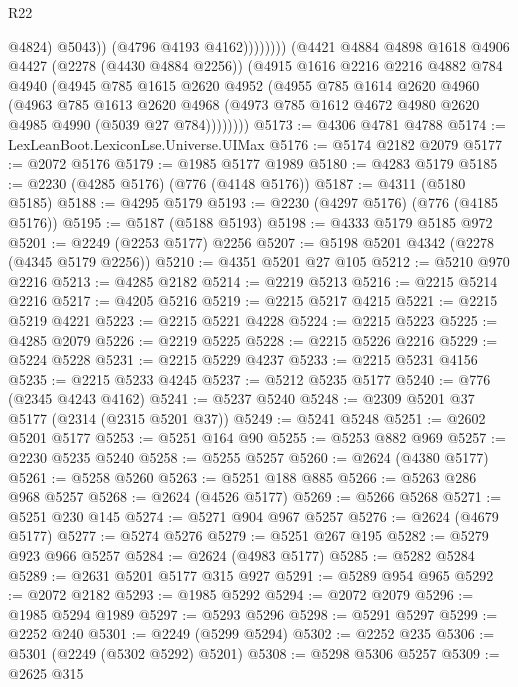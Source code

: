 \begin{lexlean}{R22}
\begin{coremodule}
                          @4824)
                        @5043))
                    (@4796 @4193 @4162))))))))
      (@4421
        @4884
        @4898
        @1618
        @4906
        @4427
        (@2278 (@4430 @4884 @2256))
        (@4915
          @1616
          @2216
          @2216
          @4882
          @784
          @4940
          (@4945
            @785
            @1615
            @2620
            @4952
            (@4955
              @785
              @1614
              @2620
              @4960
              (@4963
                @785
                @1613
                @2620
                @4968
                (@4973 @785 @1612 @4672 @4980 @2620 @4985 @4990 (@5039 @27 @784))))))))
@5173 := @4306 @4781 @4788
@5174 := LexLeanBoot.LexiconLse.Universe.UIMax
@5176 := @5174 @2182 @2079
@5177 := @2072 @5176
@5179 := @1985 @5177 @1989
@5180 := @4283 @5179
@5185 := @2230 (@4285 @5176) (@776 (@4148 @5176))
@5187 := @4311 (@5180 @5185)
@5188 := @4295 @5179
@5193 := @2230 (@4297 @5176) (@776 (@4185 @5176))
@5195 := @5187 (@5188 @5193)
@5198 := @4333 @5179 @5185 @972
@5201 := @2249 (@2253 @5177) @2256
@5207 := @5198 @5201 @4342 (@2278 (@4345 @5179 @2256))
@5210 := @4351 @5201 @27 @105
@5212 := @5210 @970 @2216
@5213 := @4285 @2182
@5214 := @2219 @5213
@5216 := @2215 @5214 @2216
@5217 := @4205 @5216
@5219 := @2215 @5217 @4215
@5221 := @2215 @5219 @4221
@5223 := @2215 @5221 @4228
@5224 := @2215 @5223
@5225 := @4285 @2079
@5226 := @2219 @5225
@5228 := @2215 @5226 @2216
@5229 := @5224 @5228
@5231 := @2215 @5229 @4237
@5233 := @2215 @5231 @4156
@5235 := @2215 @5233 @4245
@5237 := @5212 @5235 @5177
@5240 := @776 (@2345 @4243 @4162)
@5241 := @5237 @5240
@5248 := @2309 @5201 @37 @5177 (@2314 (@2315 @5201 @37))
@5249 := @5241 @5248
@5251 := @2602 @5201 @5177
@5253 := @5251 @164 @90
@5255 := @5253 @882 @969
@5257 := @2230 @5235 @5240
@5258 := @5255 @5257
@5260 := @2624 (@4380 @5177)
@5261 := @5258 @5260
@5263 := @5251 @188 @885
@5266 := @5263 @286 @968 @5257
@5268 := @2624 (@4526 @5177)
@5269 := @5266 @5268
@5271 := @5251 @230 @145
@5274 := @5271 @904 @967 @5257
@5276 := @2624 (@4679 @5177)
@5277 := @5274 @5276
@5279 := @5251 @267 @195
@5282 := @5279 @923 @966 @5257
@5284 := @2624 (@4983 @5177)
@5285 := @5282 @5284
@5289 := @2631 @5201 @5177 @315 @927
@5291 := @5289 @954 @965
@5292 := @2072 @2182
@5293 := @1985 @5292
@5294 := @2072 @2079
@5296 := @1985 @5294 @1989
@5297 := @5293 @5296
@5298 := @5291 @5297
@5299 := @2252 @240
@5301 := @2249 (@5299 @5294)
@5302 := @2252 @235
@5306 := @5301 (@2249 (@5302 @5292) @5201)
@5308 := @5298 @5306 @5257
@5309 := @2625 @315

\end{coremodule}
\end{lexlean}
